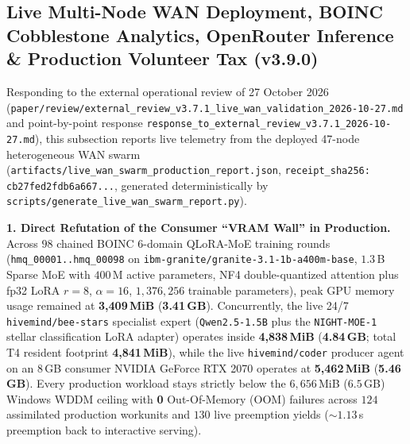 \documentclass[11pt,a4paper]{article}
\begin{document}
\subsection{Live Multi-Node WAN Deployment, BOINC Cobblestone Analytics, OpenRouter Inference \& Production Volunteer Tax (v3.9.0)}
\label{sec:live_wan_deployment}

Responding to the external operational review of 27 October 2026 (\texttt{paper/review/external\_review\_v3.7.1\_live\_wan\_validation\_2026-10-27.md} and point-by-point response \texttt{response\_to\_external\_review\_v3.7.1\_2026-10-27.md}), this subsection reports live telemetry from the deployed 47-node heterogeneous WAN swarm (\texttt{artifacts/live\_wan\_swarm\_production\_report.json}, \texttt{receipt\_sha256: cb27fed2fdb6a667...}, generated deterministically by \texttt{scripts/generate\_live\_wan\_swarm\_report.py}).

\textbf{1. Direct Refutation of the Consumer ``VRAM Wall'' in Production.}
Across $98$ chained BOINC 6-domain QLoRA-MoE training rounds (\texttt{hmq\_00001..hmq\_00098} on \texttt{ibm-granite/granite-3.1-1b-a400m-base}, $1.3$\,B Sparse MoE with $400$\,M active parameters, NF4 double-quantized attention plus fp32 LoRA $r=8$, $\alpha=16$, $1{,}376{,}256$ trainable parameters), peak GPU memory usage remained at \textbf{3{,}409\,MiB} (\textbf{3.41\,GB}). Concurrently, the live 24/7 \texttt{hivemind/bee-stars} specialist expert (\texttt{Qwen2.5-1.5B} plus the \texttt{NIGHT-MOE-1} stellar classification LoRA adapter) operates inside \textbf{4{,}838\,MiB} (\textbf{4.84\,GB}; total T4 resident footprint \textbf{4{,}841\,MiB}), while the live \texttt{hivemind/coder} producer agent on an 8\,GB consumer NVIDIA GeForce RTX 2070 operates at \textbf{5{,}462\,MiB} (\textbf{5.46\,GB}). Every production workload stays strictly below the $6{,}656$\,MiB ($6.5$\,GB) Windows WDDM ceiling with \textbf{0} Out-Of-Memory (OOM) failures across $124$ assimilated production workunits and $130$ live preemption yields ($\sim 1.13$\,s preemption back to interactive serving).
\end{document}
